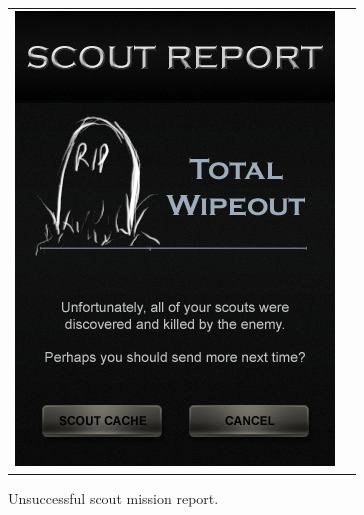 \begin{figure}[h!]
\centering
\begin{tabular}{cc}
	\begin{minipage}{0.3\textwidth}
		\begin{center}
		\begin{minipage}{0.83\textwidth}
		\includegraphics[width=\textwidth]{images/total_wipeout}
	\caption{Unsuccessful scout mission report.}
		\label{attack_cache}
		\end{minipage}
		\end{center}
	\end{minipage}
	\begin{minipage}{0.3\textwidth}
		\begin{center}
		\begin{minipage}{0.83\textwidth}

\end{minipage}
\end{center}
\end{minipage}
\end{tabular}
\end{figure}
